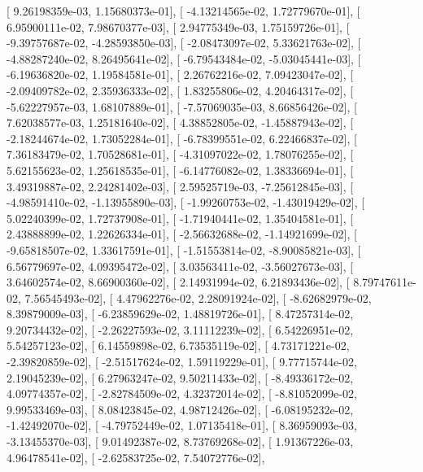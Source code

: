 \documentclass{article}
\begin{document}
       [  9.26198359e-03,   1.15680373e-01],
       [ -4.13214565e-02,   1.72779670e-01],
       [  6.95900111e-02,   7.98670377e-03],
       [  2.94775349e-03,   1.75159726e-01],
       [ -9.39757687e-02,  -4.28593850e-03],
       [ -2.08473097e-02,   5.33621763e-02],
       [ -4.88287240e-02,   8.26495641e-02],
       [ -6.79543484e-02,  -5.03045441e-03],
       [ -6.19636820e-02,   1.19584581e-01],
       [  2.26762216e-02,   7.09423047e-02],
       [ -2.09409782e-02,   2.35936333e-02],
       [  1.83255806e-02,   4.20464317e-02],
       [ -5.62227957e-03,   1.68107889e-01],
       [ -7.57069035e-03,   8.66856426e-02],
       [  7.62038577e-03,   1.25181640e-02],
       [  4.38852805e-02,  -1.45887943e-02],
       [ -2.18244674e-02,   1.73052284e-01],
       [ -6.78399551e-02,   6.22466837e-02],
       [  7.36183479e-02,   1.70528681e-01],
       [ -4.31097022e-02,   1.78076255e-02],
       [  5.62155623e-02,   1.25618535e-01],
       [ -6.14776082e-02,   1.38336694e-01],
       [  3.49319887e-02,   2.24281402e-03],
       [  2.59525719e-03,  -7.25612845e-03],
       [ -4.98591410e-02,  -1.13955890e-03],
       [ -1.99260753e-02,  -1.43019429e-02],
       [  5.02240399e-02,   1.72737908e-01],
       [ -1.71940441e-02,   1.35404581e-01],
       [  2.43888899e-02,   1.22626334e-01],
       [ -2.56632688e-02,  -1.14921699e-02],
       [ -9.65818507e-02,   1.33617591e-01],
       [ -1.51553814e-02,  -8.90085821e-03],
       [  6.56779697e-02,   4.09395472e-02],
       [  3.03563411e-02,  -3.56027673e-03],
       [  3.64602574e-02,   8.66900360e-02],
       [  2.14931994e-02,   6.21893436e-02],
       [  8.79747611e-02,   7.56545493e-02],
       [  4.47962276e-02,   2.28091924e-02],
       [ -8.62682979e-02,   8.39879009e-03],
       [ -6.23859629e-02,   1.48819726e-01],
       [  8.47257314e-02,   9.20734432e-02],
       [ -2.26227593e-02,   3.11112239e-02],
       [  6.54226951e-02,   5.54257123e-02],
       [  6.14559898e-02,   6.73535119e-02],
       [  4.73171221e-02,  -2.39820859e-02],
       [ -2.51517624e-02,   1.59119229e-01],
       [  9.77715744e-02,   2.19045239e-02],
       [  6.27963247e-02,   9.50211433e-02],
       [ -8.49336172e-02,   4.09774357e-02],
       [ -2.82784509e-02,   4.32372014e-02],
       [ -8.81052099e-02,   9.99533469e-03],
       [  8.08423845e-02,   4.98712426e-02],
       [ -6.08195232e-02,  -1.42492070e-02],
       [ -4.79752449e-02,   1.07135418e-01],
       [  8.36959093e-03,  -3.13455370e-03],
       [  9.01492387e-02,   8.73769268e-02],
       [  1.91367226e-03,   4.96478541e-02],
       [ -2.62583725e-02,   7.54072776e-02],
\end{document}
